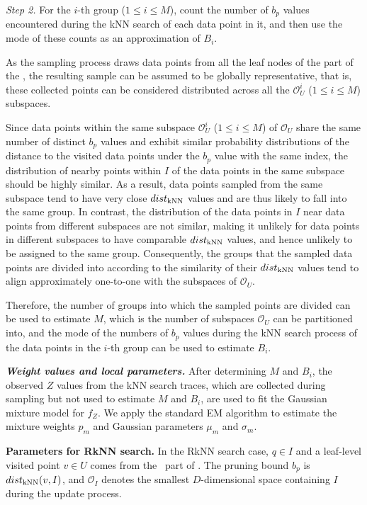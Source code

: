 \noindent\textit{Step 2.}
For the $i$-th group ($1\leq i\leq M$), count the number of $b_p$ values encountered during the kNN search of each data point in it, and then use the mode of these counts as an approximation of $B_i$.





As the sampling process draws data points from all the leaf nodes of the \hdrtree part of the \dualtree, the resulting sample can be assumed to be globally representative, that is, these collected points can be considered distributed across all the $\mathcal{O}^i_U$ ($1\leq i \leq M$) subspaces. 

Since data points within the same subspace $\mathcal{O}^{i}_{U}$ ($1\leq i\leq M$) of $\mathcal{O}_U$ share the same number of distinct $b_p$ values and exhibit similar probability distributions of the distance to the visited data points under the $b_p$ value with the same index, the distribution of nearby points within $I$ of the data points in the same subspace should be highly similar. As a result, data points sampled from the same subspace tend to have very close $dist_{\operatorname{kNN}}$ values and are thus likely to fall into the same group. In contrast, the distribution of the data points in $I$ near data points from different subspaces are not similar, making it unlikely for data points in different subspaces to have comparable $dist_{\operatorname{kNN}}$ values, and hence unlikely to be assigned to the same group. Consequently, the groups that the sampled data points are divided into according to the similarity of their $dist_{\operatorname{kNN}}$ values tend to align approximately one-to-one with the subspaces of $\mathcal{O}_U$.

Therefore, the number of groups into which the sampled points are divided can be used to estimate $M$, which is the number of subspaces $\mathcal{O}_U$ can be partitioned into, and the mode of the numbers of $b_p$ values during the kNN search process of the data points in the $i$-th group can be used to estimate $B_i$.


\noindent\textbf{\textit{Weight values and local parameters.}}
After determining $M$ and $B_i$, the observed $Z$ values from the kNN search traces, which are collected during sampling but not used to estimate $M$ and $B_i$, are used to fit the Gaussian mixture model for $f_Z$. We apply the standard EM algorithm \cite{ng2012algorithm} to estimate the mixture weights $p_m$ and Gaussian parameters $\mu_m$ and $\sigma_m$.

\noindent\textbf{Parameters for RkNN search.}
In the RkNN search case, $q\in I$ and a leaf-level visited point $v\in U$ comes from the \hdrtree\ part of \dualtree. The pruning bound $b_p$ is $dist_{\operatorname{kNN}}(v,I)$, and $\mathcal{O}_I$ denotes the smallest $D$-dimensional space containing $I$ during the update process. 

